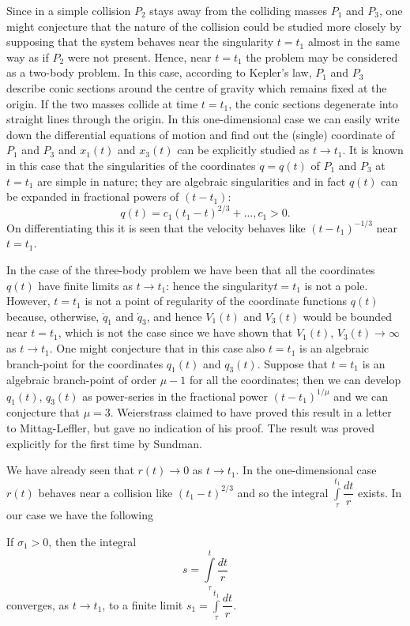 Since in a simple collision $P_2$ stays away from the colliding masses $P_1$ and $P_3$, one might conjecture that the nature of the collision could be studied more closely by supposing that the system behaves near the singularity $t = t_1$ almost in the same way as if $P_2$ were not present. Hence, near $t = t_1$ the problem may be considered as a two-body problem. In this case, according to Kepler's law, $P_1$ and $P_3$ describe conic sections around the centre of gravity which remains fixed at the origin. If the two masses collide at time $t = t_1$, the conic sections degenerate into straight lines through the origin. In this one-dimensional case we can easily write down the differential equations of motion and find out the (single) coordinate of $P_1$ and $P_3$ and $x_1(t)$ and $x_3(t)$ can be explicitly studied as $t \to t_1$. It is known in this case that the singularities of the coordinates $q = q(t)$ of $P_1$ and $P_3$ at $t= t_1$ are simple in nature; they are algebraic singularities and in fact $q(t)$ can be expanded in fractional powers of $(t - t_1)$:
$$
q(t) = c_1 (t_1 - t)^{2/3} + \ldots, c_1 >0.
$$
On differentiating this it is seen that the velocity behaves like $(t-t_1)^{-1/3}$ near $t = t_1$.

In the case of the three-body problem we have been that all the coordinates $q(t)$ have finite limits as $t \to t_1$: hence the singularity\pageoriginale $t=t_1$ is not a pole. However, $t =t_1$ is not a point of regularity of the coordinate functions $q(t)$ because, otherwise, $\dot{q}_1$ and $\dot{q}_3$, and hence $V_1(t)$ and $V_3(t)$ would be bounded near $t = t_1$, which is not the case since we have shown that $V_1 (t)$, $V_3 (t) \to \infty$ as $t \to t_1$. One might conjecture that in this case also $t =t_1$ is an algebraic branch-point for the coordinates $q_1(t)$ and $q_3(t)$. Suppose that $t = t_1$ is an algebraic branch-point of order $\mu-1$ for all the coordinates; then we can develop $q_1(t)$, $q_3(t)$ as power-series in the fractional power $(t-t_1)^{1/\mu}$ and we can conjecture that $\mu=3$. Weierstrass claimed to have proved this result in a letter to Mittag-Leffler, but gave no indication of his proof. The result was proved explicitly for the first time by Sundman.

We have already seen that $r(t) \to 0$ as $t \to t_1$. In the one-dimensional case $r(t)$ behaves near a collision like $(t_1-t)^{2/3}$ and so the integral $\int\limits^{t_1}_{\tau} \dfrac{dt}{r}$  exists. In our case we have the following 

\begin{subtheorem}[Sundman]\label{chap2:thm2.3.4}
If $\sigma_1 >0$, then the integral
\begin{equation*}
s = \int\limits^t_{\tau} \frac{dt}{r}\tag{2.3.3}\label{chap2:eq2.3.3} 
\end{equation*}
converges, as $t \to t_1$, to a finite limit $s_1 = \int\limits^{t_1}_{\tau} \dfrac{dt}{r}$. 
\end{subtheorem}

